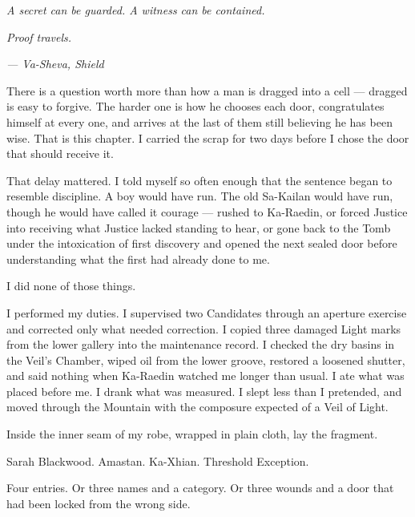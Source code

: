 
\textit{A secret can be guarded. A witness can be contained.}\par
\textit{Proof travels.}\par
\textit{--- Va-Sheva, Shield}\par

\ornament

There is a question worth more than how a man is dragged into a cell --- dragged is easy to forgive. The harder one is how he chooses each door, congratulates himself at every one, and arrives at the last of them still believing he has been wise. That is this chapter. I carried the scrap for two days before I chose the door that should receive it.\par

\ornament

That delay mattered. I told myself so often enough that the sentence began to resemble discipline. A boy would have run. The old Sa-Kailan would have run, though he would have called it courage --- rushed to Ka-Raedin, or forced Justice into receiving what Justice lacked standing to hear, or gone back to the Tomb under the intoxication of first discovery and opened the next sealed door before understanding what the first had already done to me.\par

I did none of those things.\par

I performed my duties. I supervised two Candidates through an aperture exercise and corrected only what needed correction. I copied three damaged Light marks from the lower gallery into the maintenance record. I checked the dry basins in the Veil's Chamber, wiped oil from the lower groove, restored a loosened shutter, and said nothing when Ka-Raedin watched me longer than usual. I ate what was placed before me. I drank what was measured. I slept less than I pretended, and moved through the Mountain with the composure expected of a Veil of Light.\par

Inside the inner seam of my robe, wrapped in plain cloth, lay the fragment.\par

Sarah Blackwood. Amastan. Ka-Xhian. Threshold Exception.\par

Four entries. Or three names and a category. Or three wounds and a door that had been locked from the wrong side.\par


